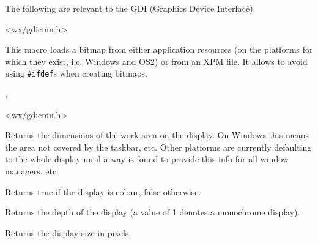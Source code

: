 The following are relevant to the GDI (Graphics Device Interface).


<wx/gdicmn.h>


\label{wxbitmapmacro}


This macro loads a bitmap from either application resources (on the platforms
for which they exist, i.e. Windows and OS2) or from an XPM file. It allows to
avoid using {\tt \#ifdef}s when creating bitmaps.


,


<wx/gdicmn.h>


\label{wxclientdisplayrect}



Returns the dimensions of the work area on the display.  On Windows
this means the area not covered by the taskbar, etc.  Other platforms
are currently defaulting to the whole display until a way is found to
provide this info for all window managers, etc.


\label{wxcolourdisplay}


Returns true if the display is colour, false otherwise.


\label{wxdisplaydepth}


Returns the depth of the display (a value of 1 denotes a monochrome display).


\label{wxdisplaysize}



Returns the display size in pixels.


\label{wxdisplaysizemm}

